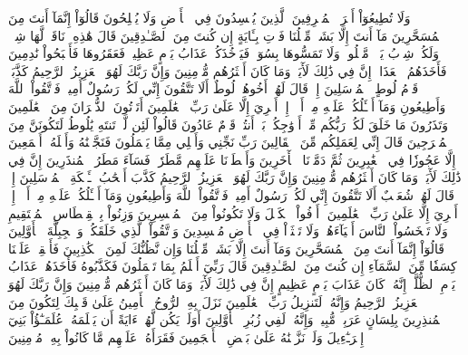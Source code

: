وَلَا تُطِيعُوٓاْ أَمۡرَ ٱلۡمُسۡرِفِينَ
ٱلَّذِينَ يُفۡسِدُونَ فِي ٱلۡأَرۡضِ وَلَا يُصۡلِحُونَ
قَالُوٓاْ إِنَّمَآ أَنتَ مِنَ ٱلۡمُسَحَّرِينَ
مَآ أَنتَ إِلَّا بَشَرٞ مِّثۡلُنَا فَأۡتِ بِـَٔايَةٍ إِن كُنتَ مِنَ ٱلصَّـٰدِقِينَ
قَالَ هَٰذِهِۦ نَاقَةٞ لَّهَا شِرۡبٞ وَلَكُمۡ شِرۡبُ يَوۡمٖ مَّعۡلُومٖ
وَلَا تَمَسُّوهَا بِسُوٓءٖ فَيَأۡخُذَكُمۡ عَذَابُ يَوۡمٍ عَظِيمٖ
فَعَقَرُوهَا فَأَصۡبَحُواْ نَٰدِمِينَ
فَأَخَذَهُمُ ٱلۡعَذَابُۚ إِنَّ فِي ذَٰلِكَ لَأٓيَةٗۖ وَمَا كَانَ أَكۡثَرُهُم مُّؤۡمِنِينَ
وَإِنَّ رَبَّكَ لَهُوَ ٱلۡعَزِيزُ ٱلرَّحِيمُ
كَذَّبَتۡ قَوۡمُ لُوطٍ ٱلۡمُرۡسَلِينَ
إِذۡ قَالَ لَهُمۡ أَخُوهُمۡ لُوطٌ أَلَا تَتَّقُونَ
إِنِّي لَكُمۡ رَسُولٌ أَمِينٞ
فَٱتَّقُواْ ٱللَّهَ وَأَطِيعُونِ
وَمَآ أَسۡـَٔلُكُمۡ عَلَيۡهِ مِنۡ أَجۡرٍۖ إِنۡ أَجۡرِيَ إِلَّا عَلَىٰ رَبِّ ٱلۡعَٰلَمِينَ
أَتَأۡتُونَ ٱلذُّكۡرَانَ مِنَ ٱلۡعَٰلَمِينَ
وَتَذَرُونَ مَا خَلَقَ لَكُمۡ رَبُّكُم مِّنۡ أَزۡوَٰجِكُمۚ بَلۡ أَنتُمۡ قَوۡمٌ عَادُونَ
قَالُواْ لَئِن لَّمۡ تَنتَهِ يَٰلُوطُ لَتَكُونَنَّ مِنَ ٱلۡمُخۡرَجِينَ
قَالَ إِنِّي لِعَمَلِكُم مِّنَ ٱلۡقَالِينَ
رَبِّ نَجِّنِي وَأَهۡلِي مِمَّا يَعۡمَلُونَ
فَنَجَّيۡنَٰهُ وَأَهۡلَهُۥٓ أَجۡمَعِينَ
إِلَّا عَجُوزٗا فِي ٱلۡغَٰبِرِينَ
ثُمَّ دَمَّرۡنَا ٱلۡأٓخَرِينَ
وَأَمۡطَرۡنَا عَلَيۡهِم مَّطَرٗاۖ فَسَآءَ مَطَرُ ٱلۡمُنذَرِينَ
إِنَّ فِي ذَٰلِكَ لَأٓيَةٗۖ وَمَا كَانَ أَكۡثَرُهُم مُّؤۡمِنِينَ
وَإِنَّ رَبَّكَ لَهُوَ ٱلۡعَزِيزُ ٱلرَّحِيمُ
كَذَّبَ أَصۡحَٰبُ لۡـَٔيۡكَةِ ٱلۡمُرۡسَلِينَ
إِذۡ قَالَ لَهُمۡ شُعَيۡبٌ أَلَا تَتَّقُونَ
إِنِّي لَكُمۡ رَسُولٌ أَمِينٞ
فَٱتَّقُواْ ٱللَّهَ وَأَطِيعُونِ
وَمَآ أَسۡـَٔلُكُمۡ عَلَيۡهِ مِنۡ أَجۡرٍۖ إِنۡ أَجۡرِيَ إِلَّا عَلَىٰ رَبِّ ٱلۡعَٰلَمِينَ
۞أَوۡفُواْ ٱلۡكَيۡلَ وَلَا تَكُونُواْ مِنَ ٱلۡمُخۡسِرِينَ
وَزِنُواْ بِٱلۡقِسۡطَاسِ ٱلۡمُسۡتَقِيمِ
وَلَا تَبۡخَسُواْ ٱلنَّاسَ أَشۡيَآءَهُمۡ وَلَا تَعۡثَوۡاْ فِي ٱلۡأَرۡضِ مُفۡسِدِينَ
وَٱتَّقُواْ ٱلَّذِي خَلَقَكُمۡ وَٱلۡجِبِلَّةَ ٱلۡأَوَّلِينَ
قَالُوٓاْ إِنَّمَآ أَنتَ مِنَ ٱلۡمُسَحَّرِينَ
وَمَآ أَنتَ إِلَّا بَشَرٞ مِّثۡلُنَا وَإِن نَّظُنُّكَ لَمِنَ ٱلۡكَٰذِبِينَ
فَأَسۡقِطۡ عَلَيۡنَا كِسَفٗا مِّنَ ٱلسَّمَآءِ إِن كُنتَ مِنَ ٱلصَّـٰدِقِينَ
قَالَ رَبِّيٓ أَعۡلَمُ بِمَا تَعۡمَلُونَ
فَكَذَّبُوهُ فَأَخَذَهُمۡ عَذَابُ يَوۡمِ ٱلظُّلَّةِۚ إِنَّهُۥ كَانَ عَذَابَ يَوۡمٍ عَظِيمٍ
إِنَّ فِي ذَٰلِكَ لَأٓيَةٗۖ وَمَا كَانَ أَكۡثَرُهُم مُّؤۡمِنِينَ
وَإِنَّ رَبَّكَ لَهُوَ ٱلۡعَزِيزُ ٱلرَّحِيمُ
وَإِنَّهُۥ لَتَنزِيلُ رَبِّ ٱلۡعَٰلَمِينَ
نَزَلَ بِهِ ٱلرُّوحُ ٱلۡأَمِينُ
عَلَىٰ قَلۡبِكَ لِتَكُونَ مِنَ ٱلۡمُنذِرِينَ
بِلِسَانٍ عَرَبِيّٖ مُّبِينٖ
وَإِنَّهُۥ لَفِي زُبُرِ ٱلۡأَوَّلِينَ
أَوَلَمۡ يَكُن لَّهُمۡ ءَايَةً أَن يَعۡلَمَهُۥ عُلَمَـٰٓؤُاْ بَنِيٓ إِسۡرَـٰٓءِيلَ
وَلَوۡ نَزَّلۡنَٰهُ عَلَىٰ بَعۡضِ ٱلۡأَعۡجَمِينَ
فَقَرَأَهُۥ عَلَيۡهِم مَّا كَانُواْ بِهِۦ مُؤۡمِنِينَ

